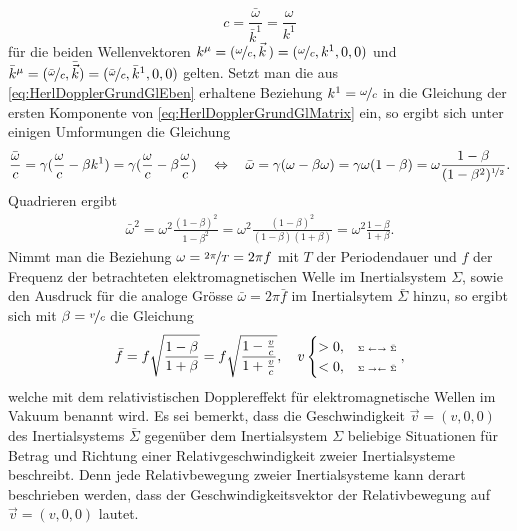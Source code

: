 \documentclass[a4paper,12pt]{article}
\numberwithin{equation}{section}
\begin{document}
\begin{equation}
c = \frac{\bar{\omega}}{\bar{k}^1} = \frac{\omega}{k^1}
\end{equation} für die beiden Wellenvektoren $k^\mu = (\nicefrac{\omega}{c},\vec{k}\,) = (\nicefrac{\omega}{c},k^1, 0,0)$ und $\bar{k}^\mu = (\nicefrac{\bar{\omega}}{c},\bar{\vec{k}}) = (\nicefrac{\bar{\omega}}{c},\bar{k}^1,0,0)$ gelten. Setzt man die aus \eqref{eq:HerlDopplerGrundGlEben} erhaltene Beziehung $k^1 = \nicefrac{\omega}{c}$ in die Gleichung der ersten Komponente von \eqref{eq:HerlDopplerGrundGlMatrix} ein, so ergibt sich unter einigen Umformungen die Gleichung \small \begin{gather}
\frac{\bar{\omega}}{c} = \gamma (\frac{\omega}{c}-\beta k^1) = \gamma (\frac{\omega}{c}-\beta \frac{\omega}{c})  \quad \Leftrightarrow \quad \bar{\omega} = \gamma (\omega - \beta \omega) = \gamma \omega (1-\beta) = \omega \frac{1-\beta}{(1-\beta^2)^{\nicefrac{1}{2}}}.
\end{gather} \normalsize Quadrieren ergibt \begin{gather}
\bar{\omega}^2 = \omega^2\frac{(1-\beta)^2}{1-\beta^2} = \omega^2\frac{(1-\beta)^2}{(1-\beta)(1+\beta)} = \omega^2\frac{1-\beta}{1+\beta}.
\end{gather} Nimmt man die Beziehung $\omega = \nicefrac{2\pi}{T} = 2\pi f$ mit $T$ der Periodendauer und $f$ der Frequenz der betrachteten elektromagnetischen Welle im Inertialsystem $\Sigma$, sowie den Ausdruck für die analoge Grösse $\bar{\omega} = 2\pi \bar{f}$ im Inertialsytem $\bar{\Sigma}$ hinzu, so ergibt sich mit $\beta = \nicefrac{v}{c}$ die Gleichung \begin{equation}\label{eq:dopplerrelemwellen}
\bar{f} = f\sqrt{\frac{1-\beta}{1+\beta}} = f\sqrt{\frac{1-\frac{v}{c}}{1+\frac{v}{c}}}, \quad v \begin{cases}
> 0, & \text{\tiny $\Sigma$ $\leftarrow \rightarrow$ $\bar{\Sigma}$} \\ < 0, & \text{\tiny $\Sigma$ $\rightarrow \leftarrow$ $\bar{\Sigma}$}
\end{cases},
\end{equation} welche mit dem relativistischen Dopplereffekt für elektromagnetische Wellen im Vakuum benannt wird. Es sei bemerkt, dass die Geschwindigkeit $\vec{v} = (v,0,0)$ des Inertialsystems $\bar{\Sigma}$ gegenüber dem Inertialsystem $\Sigma$ beliebige Situationen für Betrag und Richtung einer Relativgeschwindigkeit zweier Inertialsysteme beschreibt. Denn jede Relativbewegung zweier Inertialsysteme kann derart beschrieben werden, dass der Geschwindigkeitsvektor der Relativbewegung auf $\vec{v} = (v,0,0)$ lautet.
\end{document}
